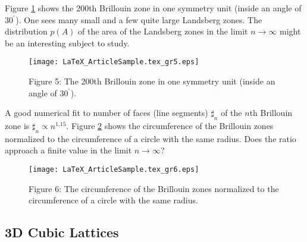 \documentclass{article}
\begin{document}
Figure \ref{XRef-Figure-227124554} shows the 200th Brillouin zone
in one symmetry unit (inside an angle of $30^{\mbox{}^{\circ}}$).
One sees many small and a few quite large Landsberg zones. The distribution
$p( A) $ of the area of the Landsberg zones in the limit $n\rightarrow
\infty $ might be an interesting subject to study. 
\begin{figure}[h]
\begin{center}
\texttt{[image: LaTeX\_ArticleSample.tex\_gr5.eps]}

\end{center}\label{XRef-Figure-227124554}
\caption{Figure 5: The 200th Brillouin zone in one symmetry unit
(inside an angle of $30^{\mbox{}^{\circ}}$).}
\end{figure}

A good numerical fit to number of faces (line segments) $\sharp
_{n}$ of the $n$th Brillouin zone is $\sharp _{n}\propto n^{1.15}$.
Figure \ref{XRef-Figure-227124537} shows the circumference of the
Brillouin zones normalized to the circumference of a circle with
the same radius. Does the ratio approach a finite value in the limit
$n\rightarrow \infty $? 
\begin{figure}[h]
\begin{center}
\texttt{[image: LaTeX\_ArticleSample.tex\_gr6.eps]}

\end{center}\label{XRef-Figure-227124537}
\caption{Figure 6: The circumference of the Brillouin zones normalized
to the circumference of a circle with the same radius.}
\end{figure}
\subsection{3D Cubic Lattices}
\end{document}
